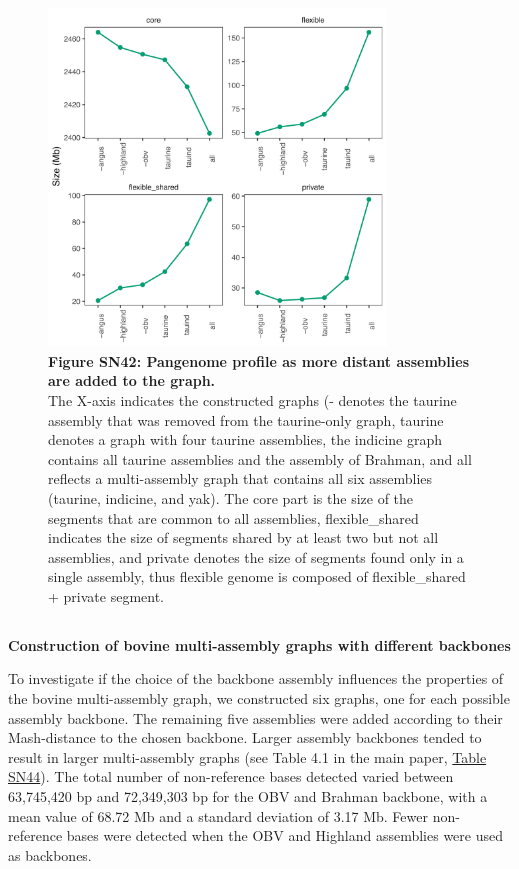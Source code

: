 \documentclass[../main.tex]{subfiles}
\begin{document}
\begin{flushleft}
\bigskip
\begin{figure}[!htb]
    \centering
    \includegraphics[width=0.8\textwidth]{paper3/supplement/sp416.pdf}
    \caption*{\textbf{\hypertarget{Figure SN42}{Figure SN42}: Pangenome profile as more distant assemblies are added to the graph.} \\
    \footnotesize{The X-axis indicates the constructed graphs (- denotes the taurine assembly that was removed from the taurine-only graph, taurine denotes a graph with four taurine assemblies, the indicine graph contains all taurine assemblies and the assembly of Brahman, and all reflects a multi-assembly graph that contains all six assemblies (taurine, indicine, and yak). The core part is the size of the segments that are common to all assemblies, flexible\_shared indicates the size of segments shared by at least two but not all assemblies, and private denotes the size of segments found only in a single assembly, thus flexible genome is composed of flexible\_shared + private segment.}}
\end{figure}

\newpage

\subsection{}
\label{sup_not:s43}
\textbf{Construction of bovine multi-assembly graphs with different backbones}
\bigskip

To investigate if the choice of the backbone assembly influences the properties of the bovine multi-assembly graph, we constructed six graphs, one for each possible assembly backbone. The remaining five assemblies were added according to their Mash-distance to the chosen backbone. Larger assembly backbones tended to result in larger multi-assembly graphs (see Table 4.1 in the main paper, \hyperlink{Table SN44}{Table SN44}). The total number of non-reference bases detected varied between 63,745,420 bp and 72,349,303 bp for the OBV and Brahman backbone, with a mean value of 68.72 Mb and a standard deviation of 3.17 Mb. Fewer non-reference bases were detected when the OBV and Highland assemblies were used as backbones.
\bigskip


\end{flushleft}
\end{document}
